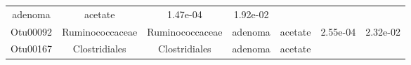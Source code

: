\documentclass[11pt,]{article}
\begin{document}
\begin{longtable}[]{@{}ccccccc@{}}
\begin{minipage}[t]{0.09\columnwidth}
adenoma\strut
\end{minipage} & \begin{minipage}[t]{0.11\columnwidth}\centering\strut
acetate\strut
\end{minipage} & \begin{minipage}[t]{0.09\columnwidth}\centering\strut
1.47e-04\strut
\end{minipage} & \begin{minipage}[t]{0.09\columnwidth}\centering\strut
1.92e-02\strut
\end{minipage}\tabularnewline
\begin{minipage}[t]{0.09\columnwidth}\centering\strut
Otu00092\strut
\end{minipage} & \begin{minipage}[t]{0.17\columnwidth}\centering\strut
Ruminococcaceae\strut
\end{minipage} & \begin{minipage}[t]{0.17\columnwidth}\centering\strut
Ruminococcaceae\strut
\end{minipage} & \begin{minipage}[t]{0.09\columnwidth}\centering\strut
adenoma\strut
\end{minipage} & \begin{minipage}[t]{0.11\columnwidth}\centering\strut
acetate\strut
\end{minipage} & \begin{minipage}[t]{0.09\columnwidth}\centering\strut
2.55e-04\strut
\end{minipage} & \begin{minipage}[t]{0.09\columnwidth}\centering\strut
2.32e-02\strut
\end{minipage}\tabularnewline
\begin{minipage}[t]{0.09\columnwidth}\centering\strut
Otu00167\strut
\end{minipage} & \begin{minipage}[t]{0.17\columnwidth}\centering\strut
Clostridiales\strut
\end{minipage} & \begin{minipage}[t]{0.17\columnwidth}\centering\strut
Clostridiales\strut
\end{minipage} & \begin{minipage}[t]{0.09\columnwidth}\centering\strut
adenoma\strut
\end{minipage} & \begin{minipage}[t]{0.11\columnwidth}\centering\strut
acetate\strut
\end{minipage} & \begin{minipage}[t]{0.09\columnwidth}\centering\strut

\end{minipage}
\end{longtable}
\end{document}
